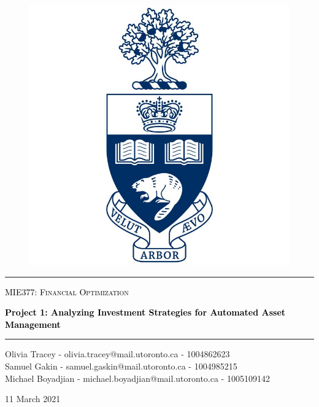 \documentclass[10pt]{article}
\begin{document}
\begin{titlepage}
	\centering
	{
	\begin{figure}[ht]
		\centering
		\includegraphics[totalheight=3.5cm]{UofT_Logo.jpg}
	\end{figure}
	
	\textcolor{black}{\noindent\rule{14cm}{0.8pt}}\par
	{\scshape\huge \textcolor{black}{MIE377: Financial Optimization} \par}
	\vspace{1cm}
	{\huge\bfseries \textcolor{black}{Project 1: Analyzing Investment Strategies for Automated Asset Management 
} \par}
	\textcolor{black}{\noindent\rule{14cm}{0.8pt}}\par
	\vspace{4cm}
		
		\centering	
		{\large Olivia Tracey - olivia.tracey@mail.utoronto.ca - 1004862623\\ \medskip  Samuel Gakin - samuel.gaskin@mail.utoronto.ca - 1004985215 \\ \medskip  Michael Boyadjian - michael.boyadjian@mail.utoronto.ca - 1005109142 \par}

	\vspace{3.5cm}
	{\large 11 March 2021 \par}}
\end{titlepage}
\end{document}
